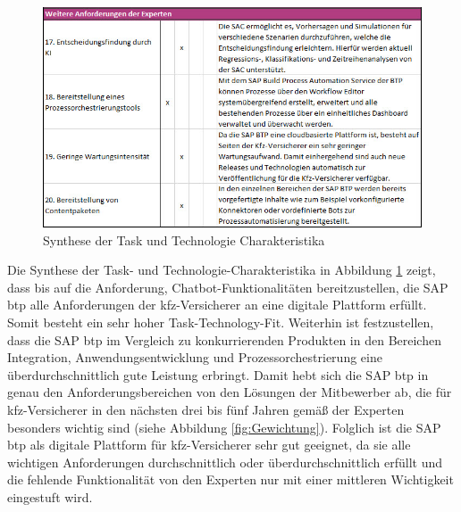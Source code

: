 \begin{figure}[ht]
    \centering
    \includegraphics[width=1\textwidth]{img/TTFTeil1_17_20.jpg}
    \caption[Synthese der Task und Technologie Charakteristika ]{Synthese der Task und Technologie Charakteristika \autocite{TTFTeil3}}
    \label{fig:TTFTeil3}
\end{figure}


\FloatBarrier

Die Synthese der Task- und Technologie-Charakteristika in Abbildung \ref{fig:TTFTeil3} zeigt, dass bis auf die Anforderung, Chatbot-Funktionalitäten bereitzustellen, die SAP \ac{btp} alle Anforderungen der \ac{kfz}-Versicherer an eine digitale Plattform erfüllt. Somit besteht ein sehr hoher Task-Technology-Fit. Weiterhin ist festzustellen, dass die SAP \ac{btp} im Vergleich zu konkurrierenden Produkten in den Bereichen Integration, Anwendungsentwicklung und Prozessorchestrierung eine überdurchschnittlich gute Leistung erbringt. Damit hebt sich die SAP \ac{btp} in genau den Anforderungsbereichen von den Lösungen der Mitbewerber ab, die für \ac{kfz}-Versicherer in den nächsten drei bis fünf Jahren gemäß der Experten besonders wichtig sind (siehe Abbildung \ref{fig:Gewichtung}). Folglich ist die SAP \ac{btp} als digitale Plattform für \ac{kfz}-Versicherer sehr gut geeignet, da sie alle wichtigen Anforderungen durchschnittlich oder überdurchschnittlich erfüllt und die fehlende Funktionalität von den Experten nur mit einer mittleren Wichtigkeit eingestuft wird. 

